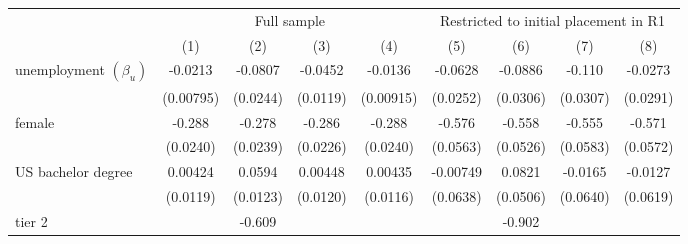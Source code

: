 \begin{table}[htbp]\centering
	\label{tb:table6}
	\begin{adjustbox}{max width=0.95\textwidth}
\begin{tabular}{l*{8}{c}}
\hline\hline
		   &\multicolumn{4}{c}{Full sample}&\multicolumn{4}{c}{Restricted to initial placement in R1}\\
            &\multicolumn{1}{c}{(1)}&\multicolumn{1}{c}{(2)}&\multicolumn{1}{c}{(3)}&\multicolumn{1}{c}{(4)}&\multicolumn{1}{c}{(5)}&\multicolumn{1}{c}{(6)}&\multicolumn{1}{c}{(7)}&\multicolumn{1}{c}{(8)}\\
\hline
unemployment $\left( \beta_u \right)$     &     -0.0213\sym{***}&     -0.0807\sym{***}&     -0.0452\sym{***}&     -0.0136         &     -0.0628\sym{**} &     -0.0886\sym{***}&      -0.110\sym{***}&     -0.0273         \\
            &   (0.00795)         &    (0.0244)         &    (0.0119)         &   (0.00915)         &    (0.0252)         &    (0.0306)         &    (0.0307)         &    (0.0291)         \\
[1em]
female&      -0.288\sym{***}&      -0.278\sym{***}&      -0.286\sym{***}&      -0.288\sym{***}&      -0.576\sym{***}&      -0.558\sym{***}&      -0.555\sym{***}&      -0.571\sym{***}\\
            &    (0.0240)         &    (0.0239)         &    (0.0226)         &    (0.0240)         &    (0.0563)         &    (0.0526)         &    (0.0583)         &    (0.0572)         \\
[1em]
US bachelor degree   &     0.00424         &      0.0594\sym{***}&     0.00448         &     0.00435         &    -0.00749         &      0.0821         &     -0.0165         &     -0.0127         \\
            &    (0.0119)         &    (0.0123)         &    (0.0120)         &    (0.0116)         &    (0.0638)         &    (0.0506)         &    (0.0640)         &    (0.0619)         \\
[1em]
tier 2     &                     &      -0.609\sym{***}&                     &                     &                     &      -0.902\sym{***}&                     &                     \\

\end{tabular}
\end{adjustbox}
\end{table}
